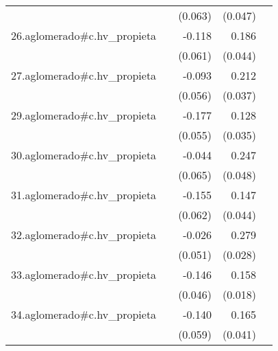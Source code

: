 {\begin{longtable}{l*{4}{D{.}{.}{-1}}}
            &                     &     (0.063)         &     (0.047)         &                     \\
\addlinespace
26.aglomerado#c.hv\_propieta&                     &      -0.118         &       0.186\sym{***}&                     \\
            &                     &     (0.061)         &     (0.044)         &                     \\
\addlinespace
27.aglomerado#c.hv\_propieta&                     &      -0.093         &       0.212\sym{***}&                     \\
            &                     &     (0.056)         &     (0.037)         &                     \\
\addlinespace
29.aglomerado#c.hv\_propieta&                     &      -0.177\sym{**} &       0.128\sym{***}&                     \\
            &                     &     (0.055)         &     (0.035)         &                     \\
\addlinespace
30.aglomerado#c.hv\_propieta&                     &      -0.044         &       0.247\sym{***}&                     \\
            &                     &     (0.065)         &     (0.048)         &                     \\
\addlinespace
31.aglomerado#c.hv\_propieta&                     &      -0.155\sym{*}  &       0.147\sym{***}&                     \\
            &                     &     (0.062)         &     (0.044)         &                     \\
\addlinespace
32.aglomerado#c.hv\_propieta&                     &      -0.026         &       0.279\sym{***}&                     \\
            &                     &     (0.051)         &     (0.028)         &                     \\
\addlinespace
33.aglomerado#c.hv\_propieta&                     &      -0.146\sym{**} &       0.158\sym{***}&                     \\
            &                     &     (0.046)         &     (0.018)         &                     \\
\addlinespace
34.aglomerado#c.hv\_propieta&                     &      -0.140\sym{*}  &       0.165\sym{***}&                     \\
            &                     &     (0.059)         &     (0.041)         &                     \\

\end{longtable}}
